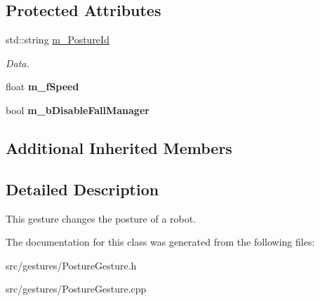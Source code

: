 \subsection*{Protected Attributes}
\begin{DoxyCompactItemize}
\item 
\mbox{\label{class_posture_gesture_af36f4a17b18a12f6266c47cac1c3a2a8}} 
std\+::string \hyperlink{class_posture_gesture_af36f4a17b18a12f6266c47cac1c3a2a8}{m\+\_\+\+Posture\+Id}
\begin{DoxyCompactList}\small\item\em Data. \end{DoxyCompactList}\item 
\mbox{\label{class_posture_gesture_a33a9bb9d0552b9ec8b3c00c3f67fd489}} 
float {\bfseries m\+\_\+f\+Speed}
\item 
\mbox{\label{class_posture_gesture_ada96aef8bb0d3cc0ccf34cc614a43db1}} 
bool {\bfseries m\+\_\+b\+Disable\+Fall\+Manager}
\end{DoxyCompactItemize}
\subsection*{Additional Inherited Members}


\subsection{Detailed Description}
This gesture changes the posture of a robot. 

The documentation for this class was generated from the following files\+:\begin{DoxyCompactItemize}
\item 
src/gestures/Posture\+Gesture.\+h\item 
src/gestures/Posture\+Gesture.\+cpp\end{DoxyCompactItemize}
